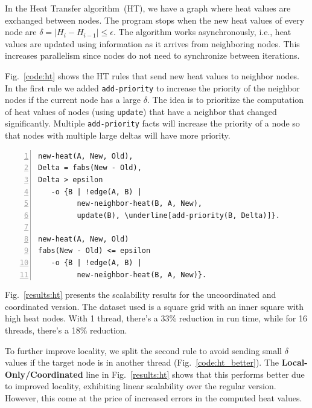 In the Heat Transfer algorithm~(HT), we have a graph where heat values
are exchanged between nodes. The program stops when the new heat
values of every node are $\delta = |H_i - H_{i-1}| \le \epsilon$. The
algorithm works asynchronously, i.e., heat values are updated using
information as it arrives from neighboring nodes. This increases
parallelism since nodes do not need to synchronize between iterations.

Fig.~\ref{code:ht} shows the HT rules that send new heat values to
neighbor nodes. In the first rule we added \texttt{add-priority} to increase the priority of the neighbor
nodes if the current node has a large $\delta$. The idea is to prioritize the
computation of heat values of nodes (using \texttt{update}) that have a neighbor
that changed significantly. Multiple \texttt{add-priority} facts will
increase the priority of a node so that nodes with multiple large deltas will
have more priority.

\begin{topfig}
\scriptsize\begin{Verbatim}[numbers=left,commandchars=\\\[\]]
new-heat(A, New, Old),
Delta = fabs(New - Old),
Delta > epsilon
   -o {B | !edge(A, B) |
         new-neighbor-heat(B, A, New),
         update(B), \underline[add-priority(B, Delta)]}.

new-heat(A, New, Old)
fabs(New - Old) <= epsilon
   -o {B | !edge(A, B) |
         new-neighbor-heat(B, A, New)}.
\end{Verbatim}
\end{topfig}
\normalsize

Fig.~\ref{results:ht} presents the scalability results for the uncoordinated
and coordinated version. The dataset used is a square grid with an inner square
with high heat nodes. With 1 thread, there's a 33\% reduction in run time, while
for 16 threads, there's a 18\% reduction.

To further improve locality, we split the second rule to avoid sending
small $\delta$ values if the target node is in another thread
(Fig.~\ref{code:ht_better}). The \textbf{Local-Only/Coordinated} line
in Fig.~\ref{results:ht} shows that this performs better due to
improved locality, exhibiting linear scalability over the regular
version.  However, this come at the price of increased errors in the
computed heat values.

